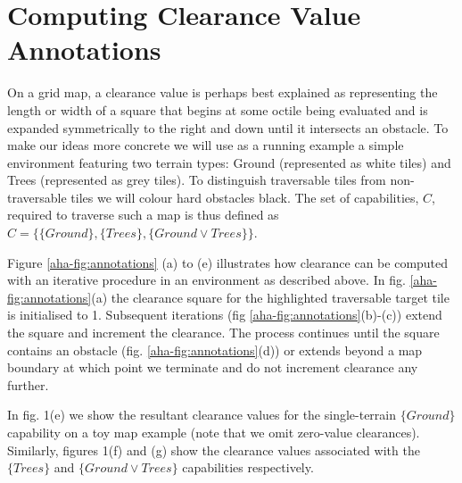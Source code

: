 \section{Computing Clearance Value Annotations}
\label{aha:planningwithannotations}
On a grid map, a clearance value is perhaps best explained as representing the length or width of a square that begins at some octile being evaluated and is expanded symmetrically to the right and down until it intersects an obstacle.     
To make our ideas more concrete we will use as a running example a simple environment featuring two terrain types: Ground (represented as white tiles) and Trees (represented as grey tiles). To distinguish traversable tiles from non-traversable tiles we will colour hard obstacles black. 
The set of capabilities, $C$, required to traverse such a map is thus defined as $C = \lbrace \lbrace Ground \rbrace, \lbrace Trees \rbrace, \lbrace Ground \vee Trees \rbrace \rbrace$.
\par \indent
Figure \ref{aha-fig:annotations} (a) to (e) illustrates how clearance can be computed with an iterative procedure in an environment as described above.
In fig. \ref{aha-fig:annotations}(a) the clearance square for the highlighted traversable target tile is initialised to 1. 
Subsequent iterations (fig \ref{aha-fig:annotations}(b)-(c)) extend the square and increment the clearance. 
The process continues until the square contains an obstacle (fig. \ref{aha-fig:annotations}(d)) or extends beyond a map boundary at which point we terminate and do not increment clearance any further.
\par \indent
In fig. 1(e) we show the resultant clearance values for the single-terrain $\lbrace Ground \rbrace$ capability on a toy map example (note that we omit zero-value clearances).
Similarly, figures 1(f) and (g) show the clearance values associated with the $\lbrace Trees \rbrace$ and $\lbrace Ground \vee Trees \rbrace$ capabilities respectively.  

